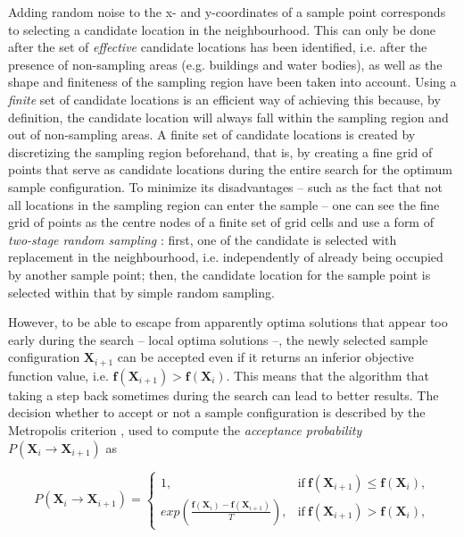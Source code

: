 Adding random noise to the x- and y-coordinates of a sample point corresponds to selecting a candidate location 
in the neighbourhood. This can only be done after the set of \emph{effective} candidate locations has been 
identified, i.e. after the presence of non-sampling areas (e.g. buildings and water bodies), as well as the 
shape and finiteness of the sampling region have been taken into account. Using a \emph{finite} set of 
candidate locations is an efficient way of achieving this because, by definition, the candidate location will 
always fall within the sampling region and out of non-sampling areas. A finite set of candidate locations is 
created by discretizing the sampling region beforehand, that is, by creating a fine grid of points that serve 
as candidate locations during the entire search for the optimum sample configuration. To minimize its 
disadvantages -- such as the fact that not all locations in the sampling region can enter the sample -- one can 
see the fine grid of points as the centre nodes of a finite set of grid cells and use a form of \emph{two-stage 
random sampling} \cite{WalvoortEtAl2010}: first, one of the candidate  is selected with 
replacement in the neighbourhood, i.e. independently of already being occupied by another sample point; then, 
the candidate location for the sample point is selected within that  by simple random sampling.

However, to be able to escape from apparently optima solutions that appear too early during the search -- 
local optima solutions --, the newly selected sample configuration $\boldsymbol{X}_{i + 1}$ can be 
accepted even if it returns an inferior objective function value, i.e. $\boldsymbol{f}(\boldsymbol{X}_{i + 1}) 
>  \boldsymbol{f}(\boldsymbol{X}_i)$. This means that the algorithm  that taking a step back 
sometimes during the search can lead to better results. The decision whether to accept or not a sample 
configuration is described by the Metropolis criterion \cite{MetropolisEtAl1953}, used to compute the 
\emph{acceptance probability} $P(\boldsymbol{X}_i \rightarrow \boldsymbol{X}_{i + 1})$ as

\begin{equation}\label{eqn:chap08-metropolis} %
 P(\boldsymbol{X}_i \rightarrow \boldsymbol{X}_{i + 1}) = 
 \begin{cases}
  1, & \text{if}\  \boldsymbol{f}(\boldsymbol{X}_{i + 1}) \leq  \boldsymbol{f}(\boldsymbol{X}_i), \\ 
  exp\left(\frac{\boldsymbol{f}(\boldsymbol{X}_i) -  \boldsymbol{f}(\boldsymbol{X}_{i + 1})}{T}\right),  
      & \text{if}\  \boldsymbol{f}(\boldsymbol{X}_{i + 1}) >  \boldsymbol{f}(\boldsymbol{X}_i ),
 \end{cases}
\end{equation}

